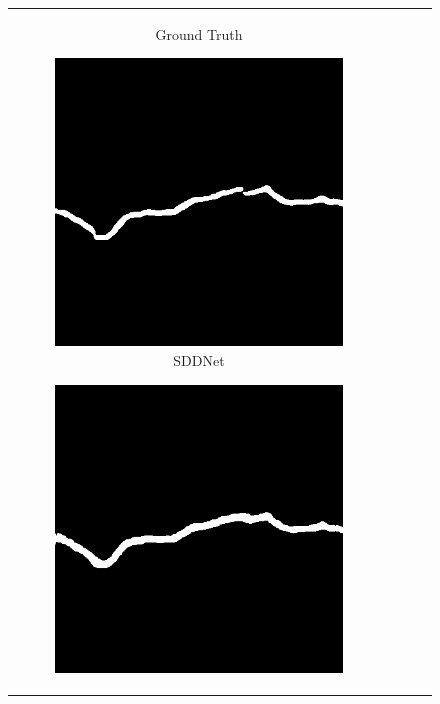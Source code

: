 \documentclass[a4paper,12pt]{report}
\begin{document}
\begin{figure}[htbp]
\begin{tabular}{cccc}
\begin{subfigure}[b]{0.23\textwidth}
            \caption{Ground Truth}
            \label{fig:crackseg-experiment-qualitative-ground-truth}
        \end{subfigure}
        \begin{subfigure}[b]{0.23\textwidth}
            \centering
            \includegraphics[width=\textwidth]{res/crackseg-experiment-qualitative/sddnet.png}
            \caption{SDDNet}
            \label{fig:crackseg-experiment-qualitative-sddnet}
        \end{subfigure}
        \begin{subfigure}[b]{0.23\textwidth}
            \centering
            \includegraphics[width=\textwidth]{res/crackseg-experiment-qualitative/unet.png}

\end{subfigure}
\end{tabular}
\end{figure}
\end{document}

